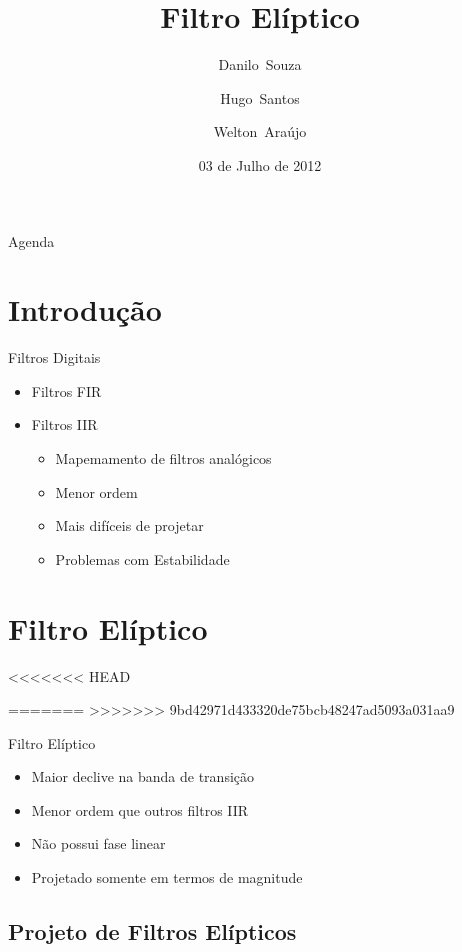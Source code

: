 \documentclass{beamer}
\title[Filtro El\'iptico]{%
Filtro El\'iptico%
}
\author[Souza,Santos,Ara\'ujo]{
     Danilo~Souza\and
     Hugo~Santos\and
     Welton~Ara\'ujo
     }
\institute[Bel\'em]{
  \inst{1}%
  Universidade Federal do Par\'a
  }
\date[Bel\'em 2012]{
  03 de Julho de 2012
  }
\begin{document}
\begin{frame}
  \titlepage
\end{frame}

\begin{frame}{Agenda}
  \tableofcontents
\end{frame}

\section{Introdu\c{c}\~ao}
\begin{frame}{Filtros Digitais}
	\begin{itemize}
	 \item	Filtros FIR
	 \item	Filtros IIR
		\begin{itemize}
		  \item Mapemamento de filtros anal\'ogicos
		  \item Menor ordem
		  \item Mais dif\'iceis de projetar
		  \item Problemas com Estabilidade
		\end{itemize}
	\end{itemize}
\end{frame}



\section{Filtro El\'iptico}
<<<<<<< HEAD

	
=======
>>>>>>> 9bd42971d433320de75bcb48247ad5093a031aa9
	\begin{frame}{Filtro El\'iptico}
		\begin{itemize}
			\item Maior declive na banda de transi\c{c}\~ao
			\item Menor ordem que outros filtros IIR
			\item N\~ao possui fase linear
			\item Projetado somente em termos de magnitude
		\end{itemize}
	\end{frame}




\subsection{Projeto de Filtros El\'ipticos}
   
\end{document}
